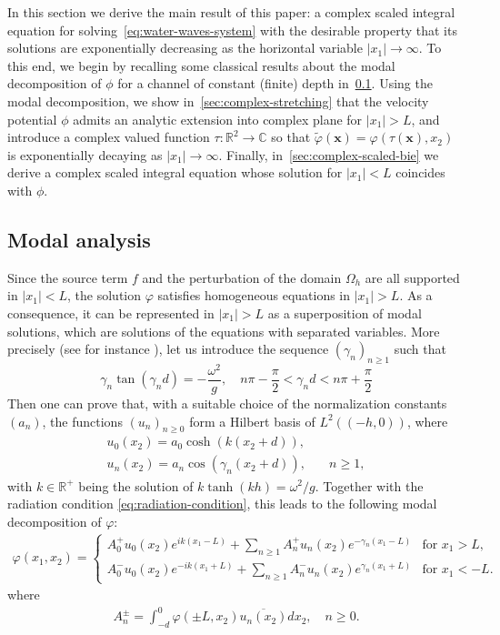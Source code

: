 \documentclass[11pt]{article}
\newcommand{\R}{\mathbb{R}}
\newcommand{\C}{\mathbb{C}}
\newcommand{\bx}{\mathbf{x}}
\newcommand{\tvarphi}{\tilde \varphi}
\begin{document}
In this section we derive the main result of this paper: a complex scaled
integral equation for solving~\cref{eq:water-waves-system} with the desirable
property that its solutions are exponentially decreasing as the horizontal
variable $|x_1| \to \infty$. To this end, we begin by recalling some classical
results about the modal decomposition of $\phi$ for a channel of constant
(finite) depth in~\cref{sec:modal-analysis}. Using the modal decomposition, we
show in~\cref{sec:complex-stretching} that the velocity potential $\phi$ admits
an analytic extension into complex plane for $|x_1| > L$, and introduce a
complex valued function $\tau : \R^2 \to \C$ so that $\tvarphi(\bx) =
\varphi(\tau(\bx),x_2)$ is exponentially decaying as $|x_1| \to \infty$.
Finally, in~\cref{sec:complex-scaled-bie} we derive a complex scaled integral
equation whose solution for $|x_1| < L$ coincides with $\phi.$

\subsection{Modal analysis}\label{sec:modal-analysis}

Since the source term $f$ and the perturbation of the domain $\Omega_h$ are all
supported in $|x_1|<L$,  the solution $\varphi$ satisfies homogeneous equations
in $|x_1|>L$. As a consequence, it can be represented in $|x_1|>L$ as a
superposition of modal solutions,  which are solutions of the equations with
separated variables. More precisely (see for instance \cite{Bon-Jol-1993}), let
us introduce the sequence $(\gamma_n)_{n\geq 1}$ such that
\begin{equation}
  \label{eq:disp-evanescent}
  \gamma_n\tan(\gamma_n d)=-\dfrac{\omega^2}{g},\quad n\pi-\frac{\pi}{2}<\gamma_n d<n\pi+\frac{\pi}{2}
\end{equation}
Then one can prove that, with a suitable choice of the normalization constants
$(a_n)$, the functions $(u_n)_{n\geq 0}$ form a Hilbert basis of $L^2((-h,0))$,
where
\begin{align}
\label{eq:transversemodes}
u_0(x_2)=a_0\cosh(k(x_2+d)),&\\
u_n(x_2)=a_n\cos(\gamma_n(x_2+d)),& \quad n\geq 1,
\end{align}
with $k \in \R^+$ being the solution of $k\tanh(kh)=\omega^2/g$. Together with
the radiation condition \cref{eq:radiation-condition}, this leads to the
following modal decomposition of $\varphi$:
%
\begin{align}
  \label{eq:modaldecomp}
  \varphi(x_1,x_2) = \begin{cases}
  A_0^+u_0(x_2)e^{ik(x_1-L)} + \sum_{n\geq 1}A_n^+u_n(x_2)e^{-\gamma_n(x_1-L)} &\mbox{for }x_1>L,\\
  A_0^-u_0(x_2)e^{-ik(x_1+L)} +\sum_{n\geq 1}A_n^-u_n(x_2)e^{\gamma_n(x_1+L)} &\mbox{for }x_1<-L.
  \end{cases}
\end{align}
where 
\begin{align}
  A_n^\pm=\int_{-d}^0\varphi(\pm L,x_2)\overline{u_n(x_2)}dx_2,\quad n\geq 0.  
\end{align}
\end{document}
